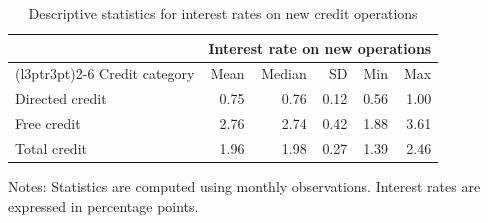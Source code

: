 \begin{table}[!h]
\centering
\caption{Descriptive statistics for interest rates on new credit operations}
\centering
\fontsize{10}{12}\selectfont
\begin{threeparttable}
\begin{tabular}[t]{lrrrrr}
\toprule
\multicolumn{1}{c}{ } & \multicolumn{5}{c}{Interest rate on new operations} \\
\cmidrule(l{3pt}r{3pt}){2-6}
Credit category & Mean & Median & SD & Min & Max\\
\midrule
Directed credit & 0.75 & 0.76 & 0.12 & 0.56 & 1.00\\
Free credit & 2.76 & 2.74 & 0.42 & 1.88 & 3.61\\
Total credit & 1.96 & 1.98 & 0.27 & 1.39 & 2.46\\
\bottomrule
\end{tabular}
\begin{tablenotes}[para]
\item Notes: Statistics are computed using monthly observations. Interest rates are expressed in percentage points.
\end{tablenotes}
\end{threeparttable}
\end{table}
